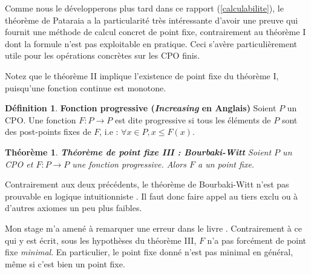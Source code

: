 \documentclass{article}
\newcommand{\yz}[1]{\textcolor{blue}{{[YZ:~#1]}}}
\newtheorem{theorem}{Théorème}[section]
\theoremstyle{definition}
\newtheorem{definition}{Définition}[section]
\begin{document}
Comme nous le développerons plus tard dans ce rapport (\ref{calculabilite}), le théorème de Pataraia a
la particularité très intéressante d'avoir une preuve qui fournit une méthode de calcul concret de point fixe, contrairement au théorème I dont la formule n'est pas exploitable en pratique. Ceci s'avère particulièrement utile pour les opérations concrètes sur les CPO finis. %

Notez que le théorème II implique l'existence de point fixe du théorème I, puisqu'une fonction continue est monotone.

\begin{definition}{\textbf{Fonction progressive (\textit{Increasing} en Anglais)}}
Soient $P$ un CPO. Une fonction $F : P \rightarrow P$ est dite progressive si tous les éléments de $P$ sont des post-points fixes de $F$, i.e : $\forall x \in P, x \leq F(x)$.

\end{definition}

\begin{theorem}{\textbf{Théorème de point fixe III : Bourbaki-Witt}}
Soient $P$ un CPO et $F : P \rightarrow P$ une fonction progressive. Alors $F$ a un point fixe.
\end{theorem}

Contrairement aux deux précédents, le théorème de Bourbaki-Witt n'est pas prouvable en logique intuitionniste \cite{bw}. Il faut donc faire appel au tiers exclu ou à d'autres axiomes un peu plus faibles.

Mon stage m'a amené à remarquer une erreur dans le livre \cite[page 188]{main}.
Contrairement à ce qui y est écrit, sous les hypothèses du théorème III, $F$ n'a pas forcément de point fixe \emph{minimal}. En particulier, le point fixe donné n'est pas minimal en général, même si c'est bien un point fixe.%
\end{document}
